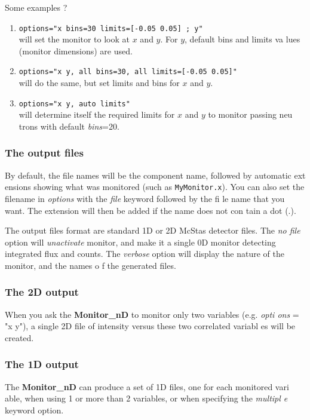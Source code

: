 \documentclass[12pt]{report}
\begin{document}
Some examples ?
\begin{enumerate}
\item{\texttt{options="x bins=30 limits=[-0.05 0.05] ; y"} \\
will set the monitor to look at $x$ and $y$. For $y$, default bins and limits va
lues (monitor dimensions) are used.}
\item{\texttt{options="x y, all bins=30, all limits=[-0.05 0.05]"} \\
will do the same, but set limits and bins for $x$ and $y$.}
\item{\texttt{options="x y, auto limits"} \\
will determine itself the required limits for $x$ and $y$ to monitor passing neu
trons with default {\it bins}=20.}
\end{enumerate}

\subsubsection{The output files}

By default, the file names will be the component name, followed by automatic ext
ensions showing what was monitored (such as \texttt{MyMonitor.x}). You can also 
set the filename in {\it options} with the {\it file} keyword followed by the fi
le name that you want. The extension will then be added if the name does not con
tain a dot (.).

The output files format are standard 1D or 2D McStas detector files.
The {\it no file} option will {\it unactivate} monitor, and make it a single 0D 
monitor detecting integrated flux and counts.
The {\it verbose} option will display the nature of the monitor, and the names o
f the generated files.

\subsubsection{The 2D output}

When you ask the {\bf Monitor\_nD} to monitor only two variables (e.g. {\it opti
ons} = "x y"), a single 2D file of intensity versus these two correlated variabl
es will be created.

\subsubsection{The 1D output}

The {\bf Monitor\_nD} can produce a set of 1D files, one for each monitored vari
able, when using 1 or more than 2 variables, or when specifying the {\it multipl
e} keyword option.
\end{document}
